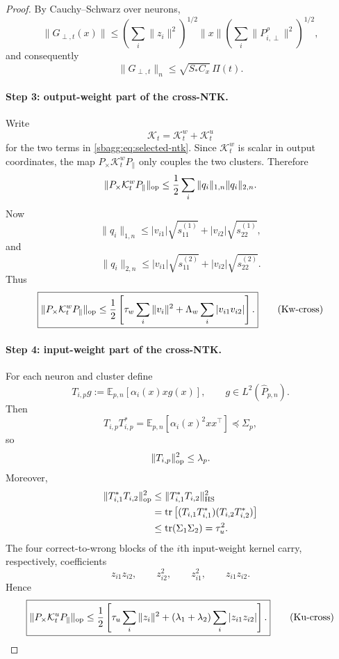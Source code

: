 \documentclass{article} %
\theoremstyle{plain}
\theoremstyle{definition}
\theoremstyle{remark}
\begin{document}
\begin{proof}
By Cauchy--Schwarz over neurons,
\[
\|G_{\perp,t}(x)\|
\le
\left(\sum_i\|z_i\|^2\right)^{1/2}
\|x\|
\left(\sum_i\|P_{i,\perp}^\rho\|^2\right)^{1/2},
\]
and consequently
\[
\boxed{
\|G_{\perp,t}\|_n
\le
\sqrt{S_*C_x}\,\Pi(t).
}
\tag{Gperp-bound}
\label{sbagg:eq:Gperp-bound}
\]

\paragraph{Step 3: output-weight part of the cross-NTK.}

Write
\[
\mathcal K_t=\mathcal K_t^w+\mathcal K_t^u
\]
for the two terms in \eqref{sbagg:eq:selected-ntk}.  Since
$\mathcal K_t^w$ is scalar in output coordinates, the map
$P_\times\mathcal K_t^wP_\parallel$ only couples the two clusters.
Therefore
\[
\|P_\times\mathcal K_t^wP_\parallel\|_{\rm op}
\le
\frac12
\sum_i
\|q_i\|_{1,n}\|q_i\|_{2,n}.
\]
Now
\[
\|q_i\|_{1,n}
\le
|v_{i1}|\sqrt{s_{11}^{(1)}}
+
|v_{i2}|\sqrt{s_{22}^{(1)}},
\]
and
\[
\|q_i\|_{2,n}
\le
|v_{i1}|\sqrt{s_{11}^{(2)}}
+
|v_{i2}|\sqrt{s_{22}^{(2)}}.
\]
Thus
\[
\boxed{
\|P_\times\mathcal K_t^wP_\parallel\|_{\rm op}
\le
\frac12
\left[
\tau_w\sum_i\|v_i\|^2
+
\Lambda_w
\sum_i|v_{i1}v_{i2}|
\right].
}
\tag{Kw-cross}
\label{sbagg:eq:Kw-cross}
\]

\paragraph{Step 4: input-weight part of the cross-NTK.}

For each neuron and cluster define
\[
T_{i,p}g
:=
\mathbb E_{p,n}[
\alpha_i(x)xg(x)
],
\qquad
g\in L^2(\widehat P_{p,n}).
\]
Then
\[
T_{i,p}T_{i,p}^*
=
\mathbb E_{p,n}[
\alpha_i(x)^2xx^\top
]
\preceq
\Sigma_p,
\]
so
\[
\|T_{i,p}\|_{\rm op}^2\le\lambda_p.
\]
Moreover,
\[
\begin{aligned}
\|T_{i,1}^*T_{i,2}\|_{\rm op}^2
&\le
\|T_{i,1}^*T_{i,2}\|_{\rm HS}^2
\\
&=
\operatorname{tr}
\left[
(T_{i,1}T_{i,1}^*)
(T_{i,2}T_{i,2}^*)
\right]
\\
&\le
\operatorname{tr}(\Sigma_1\Sigma_2)
=
\tau_u^2.
\end{aligned}
\]
The four correct-to-wrong blocks of the $i$th input-weight kernel carry,
respectively, coefficients
\[
z_{i1}z_{i2},
\qquad
z_{i2}^2,
\qquad
z_{i1}^2,
\qquad
z_{i1}z_{i2}.
\]
Hence
\[
\boxed{
\|P_\times\mathcal K_t^uP_\parallel\|_{\rm op}
\le
\frac12
\left[
\tau_u\sum_i\|z_i\|^2
+
(\lambda_1+\lambda_2)
\sum_i|z_{i1}z_{i2}|
\right].
}
\tag{Ku-cross}
\label{sbagg:eq:Ku-cross}
\]


\end{proof}
\end{document}
